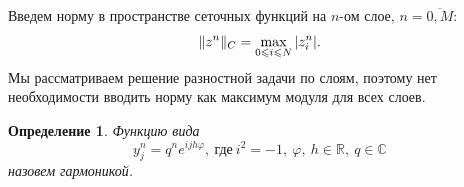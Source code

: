\documentclass[11pt,a4paper,twoside]{report}
\numberwithin{equation}{section}
\newtheorem*{definition}{Определение}
\theoremstyle{definition}
\theoremstyle{plain}
\DeclarePairedDelimiter\norm{\lVert}{\rVert}
\begin{document}
Введем норму в пространстве сеточных функций на $n$-ом слое,
$n=\overline{0, M}$:
%
$$
    \norm{z^n}_C=\max_{0\leqslant i\leqslant N}|z_i^n|.
$$
%
Мы рассматриваем решение разностной задачи по слоям, поэтому нет необходимости
вводить норму как максимум модуля для всех слоев.

\begin{definition}
%
    Функцию вида
    \begin{equation}
            \label{garmo}
            y_j^n = q^n e^{ijh\varphi},~\text{где}~i^2 = -1,~\varphi,~h \in \mathbb{R},~q \in \mathbb{C}
    \end{equation}
    назовем гармоникой.
%
\end{definition}
%
\fi %
\end{document}
